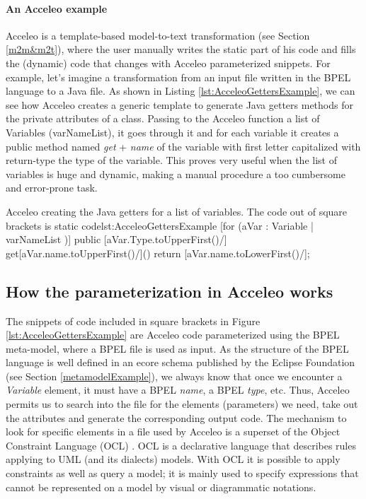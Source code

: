 \paragraph{An Acceleo example}
Acceleo is a template-based model-to-text transformation (see Section \ref{m2m&m2t}), where the user manually writes the static part of his code and fills the (dynamic) code that changes with Acceleo parameterized snippets.
For example, let's imagine a transformation from an input file written in the BPEL language to a Java file. As shown in Listing \ref{lst:AcceleoGettersExample}, we can see how Acceleo creates a generic template to generate Java getters methods for the private attributes of a class. Passing to the Acceleo function a list of Variables (varNameList), it goes through it and for each variable it creates a public method named \textit{get} + \textit{name} of the variable with first letter capitalized with return-type the type of the variable. This proves very useful when the list of variables is huge and dynamic, making a manual procedure a too cumbersome and error-prone task.

\begin{workflow-code}{Acceleo creating the Java getters for a list of variables. The code out of square brackets is static code}{lst:AcceleoGettersExample}
[for (aVar : Variable | varNameList )]
public [aVar.Type.toUpperFirst()/] get[aVar.name.toUpperFirst()/]() {
	return [aVar.name.toLowerFirst()/];
}
\end{workflow-code}

\subsection{How the parameterization in Acceleo works}
The snippets of code included in square brackets in Figure \ref{lst:AcceleoGettersExample} are Acceleo code parameterized using the BPEL meta-model, where a BPEL file is used as input. As the structure of the BPEL language is well defined in an ecore schema published by the Eclipse Foundation (see Section \ref{metamodelExample}), we always know that once we encounter a \textit{Variable} element, it must have a BPEL \textit{name}, a BPEL \textit{type}, etc. 
Thus, Acceleo permits us to search into the file for the elements (parameters) we need, take out the attributes and generate the corresponding output code.
The mechanism to look for specific elements in a file used by Acceleo is a superset of the Object Constraint Language (OCL) \cite{UML20OCL}. OCL is a declarative language that describes rules applying to UML (and its dialects) models. With OCL it is possible to apply constraints as well as query a model; it is mainly used to specify expressions that cannot be represented on a model by visual or diagrammatic notations.

